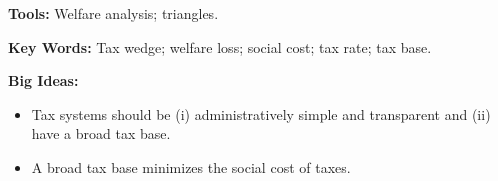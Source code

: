 \textbf{Tools:} Welfare analysis; triangles.

\textbf{Key Words:} Tax wedge; welfare loss; social cost; tax rate; tax base.

\textbf{Big Ideas:}
\begin{itemize}
\item Tax systems should be (i) administratively simple and transparent and (ii) have a broad tax base.
\item A broad tax base minimizes the social cost of taxes.
\end{itemize}
